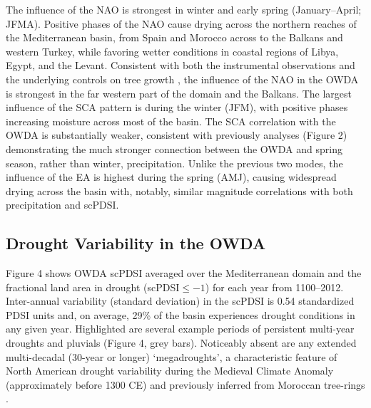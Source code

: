 \documentclass[draft,jgr]{AGUTeX}
\begin{document}
\begin{article}
\indent The influence of the NAO is strongest in winter and early spring (January--April; JFMA). Positive phases of the NAO cause drying across the northern reaches of the Mediterranean basin, from Spain and Morocco across to the Balkans and western Turkey, while favoring wetter conditions in coastal regions of Libya, Egypt, and the Levant.  Consistent with both the instrumental observations \citep[e.g.][]{Lamb:etal1997,Knippertz:etal2003} and the underlying controls on tree growth \citep{Touchan:etal2008a,Touchan:etal2008b,Panayotov:etal2010}, the influence of the NAO in the OWDA is strongest in the far western part of the domain and the Balkans. The largest influence of the SCA pattern is during the winter (JFM), with positive phases increasing moisture across most of the basin. The SCA correlation with the OWDA is substantially weaker, consistent with previously analyses (Figure 2) demonstrating the much stronger connection between the OWDA and spring season, rather than winter, precipitation. Unlike the previous two modes, the influence of the EA is highest during the spring (AMJ), causing widespread drying across the basin with, notably, similar magnitude correlations with both precipitation and scPDSI.

\subsection{Drought Variability in the OWDA}
\noindent Figure 4 shows OWDA scPDSI averaged over the Mediterranean domain and the fractional land area in drought (scPDSI$\le-1$) for each year from 1100--2012. Inter-annual variability (standard deviation) in the scPDSI is 0.54 standardized PDSI units and, on average, 29\% of the basin experiences drought conditions in any given year. Highlighted are several example periods of persistent multi-year droughts and pluvials (Figure 4, grey bars). Noticeably absent are any extended multi-decadal (30-year or longer) `megadroughts', a characteristic feature of North American drought variability during the Medieval Climate Anomaly (approximately before 1300 CE) \citep[e.g.,][]{CookER2010b} and previously inferred from Moroccan tree-rings \citep{Esper:etal2007a}.


\end{article}
\end{document}
